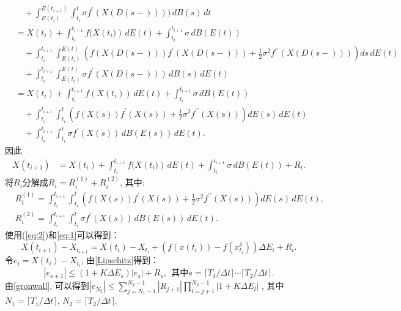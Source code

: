 \documentclass[12pt, final]{article}
\makeatletter
\numberwithin{equation}{section}
\numberwithin{figure}{section}
\numberwithin{table}{section}
\theoremstyle{plain}
\renewcommand{\proofname}{证明}
\theoremstyle{Definition}
\theoremstyle{Remark}
\renewenvironment{proof}[1][\proofname]{\par
	\pushQED{\qed}%
	\normalfont \topsep6\p@\@plus6\p@\relax
	\trivlist\item[\hskip\labelsep
	\bfseries #1\@addpunct{\, :\, }]\ignorespaces
}{%
	\popQED\endtrivlist\@endpefalse
}
\makeatother
\begin{document}
\begin{proof}
\begin{align*}
			&\quad + \int_{E(t_i)}^{E(t_{i+1})} \int_{t_i}^{t}\sigma f^{\prime}(X(D(s-)))) \, dB(s) \, dt \\
			&= X(t_i) + \int_{t_i}^{t_{i+1}} f(X({t_i)}) \, dE(t) + \int_{t_i}^{t_{i+1}} \sigma \, dB(E(t)) \\
			&\quad + \int_{t_i}^{t_{i+1}} \int_{E(t_i)}^{E(t)} \left( f(X(D(s-))) f^{\prime}(X(D(s-))) + \frac{1}{2} \sigma^2 f^{\prime\prime}(X(D(s-))) \right) ds \, dE(t) \\
			&\quad + \int_{t_i}^{t_{i+1}} \int_{E(t_i)}^{E(t)}\sigma f^{\prime}(X(D(s-))) \, dB(s) \, dE(t)\\
			&= X(t_i) + \int_{t_i}^{t_{i+1}} f(X({t_i})) \, dE(t) + \int_{t_i}^{t_{i+1}} \sigma \, dB(E(t)) \\
			&\quad + \int_{t_i}^{t_{i+1}} \int_{t_i}^{t} \left( f(X(s)) f^{\prime}(X(s)) + \frac{1}{2} \sigma^2 f^{\prime\prime}(X(s)) \right) dE(s) \, dE(t) \\
			&\quad + \int_{t_i}^{t_{i+1}} \int_{t_i}^{t}\sigma f^{\prime}(X(s)) \, dB(E(s)) \, dE(t). 
		\end{align*}
		因此
		\begin{align}\label{eq:2}
			X(t_{i+1})
			&= X(t_i) + \int_{t_i}^{t_{i+1}} f(X({t_i)}) \, dE(t) + \int_{t_i}^{t_{i+1}} \sigma \, dB(E(t)) + R_i. 
		\end{align}
		将$R_i$分解成$R_i = R_i^{(1)} + R_i^{(2)}$, 其中:
		\begin{align*}
			& R_i^{(1)} = \int_{t_i}^{t_{i+1}} \int_{t_i}^{t} \left( f(X(s)) f^{\prime}(X(s)) + \frac{1}{2} \sigma^2 f^{\prime\prime}(X(s)) \right) dE(s) \, dE(t), \\
			& R_i^{(2)} = \int_{t_i}^{t_{i+1}} \int_{t_i}^{t} \sigma f^{\prime}(X(s)) \, dB(E(s)) \, dE(t). 
		\end{align*}
		使用(\ref{eq:2})和\eqref{eq:1}可以得到：
		\begin{equation}
			X({t_{i+1}})-X_{t_{i+1}}=X({t_i})-X_{t_i}+(f{(x({t_i}))}-f{(x^\delta_{t_i})})\Delta E_{i}+R_{i}. 
		\end{equation}
		令$e_i = X({t_i})-X_{t_i}$, 由\cref{Lipschitz}得到：
		\begin{equation}
			|e_{s+1}|\leq(1+K{\Delta}E_{s})|e_{s}|+R_{s}, ~~\text{其中}s=\lceil T_1/\Delta t \rceil\cdots \lceil T_2 /\Delta t \rceil. 
		\end{equation}
		由\cref{gronwall}, 可以得到$|e_{N_2}| \leq \sum\limits_{j = N_1 - 1}^{N_2-1}|R_{j+1}|\prod\limits_{l=j+1}^{N_2-1}|1+K\Delta E_l|$
		, 其中$N_1 = \lceil T_1/\Delta t \rceil$, $N_2 = \lceil T_2/\Delta t \rceil$. \\

\end{proof}
\end{document}
